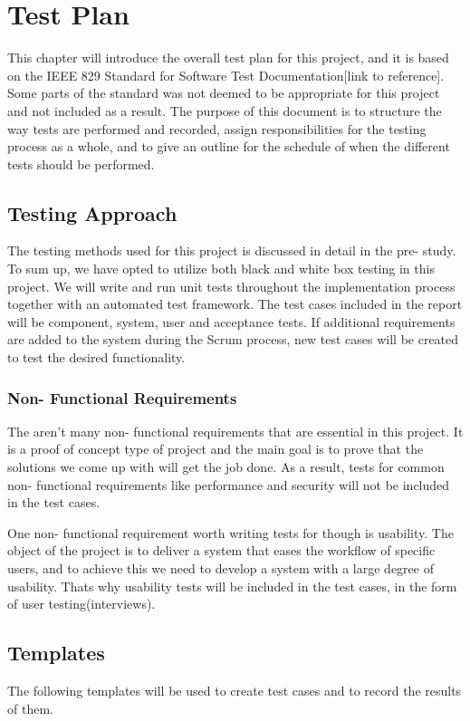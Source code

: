 \section{Test Plan}
This chapter will introduce the overall test plan for this project, and it is based on the IEEE 829 Standard for Software Test Documentation[link to reference]. Some parts of the standard was not deemed to be appropriate for this project and not included as a result. The purpose of this document is to structure the way tests are performed and recorded, assign responsibilities for the testing process as a whole, and to give an outline for the schedule of when the different tests should be performed.

\subsection{Testing Approach}
The testing methods used for this project is discussed in detail in the pre- study. To sum up, we have opted to utilize both black and white box testing in this project. We will write and run unit tests throughout the implementation process together with an automated test framework. The test cases included in the report will be component, system, user and acceptance tests. If additional requirements are added to the system during the Scrum process, new test cases will be created to test the desired functionality.

\subsubsection{Non- Functional Requirements}
The aren’t many non- functional requirements that are essential in this project. It is a proof of concept type of project and the main goal is to prove that the solutions we come up with will get the job done. As a result, tests for common non- functional requirements like performance and security will not be included in the test cases. 

One non- functional requirement worth writing tests for though is usability. The object of the project is to deliver a system that eases the workflow of specific users, and to achieve this we need to develop a system with a large degree of usability. Thats why usability tests will be included in the test cases, in the form of user testing(interviews).

\subsection{Templates}
The following templates will be used to create test cases and to record the results of them.

